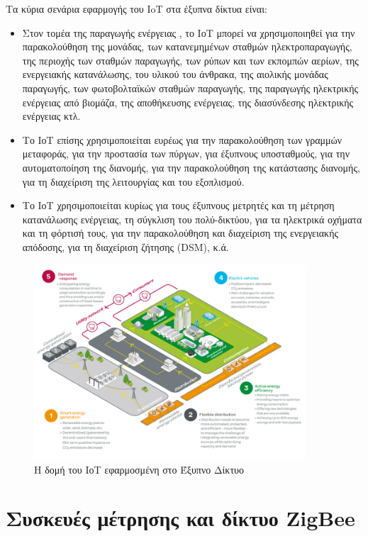 \documentclass[12pt, a4paper, oneside]{report}
\begin{document}
Τα κύρια σενάρια εφαρμογής του IoT στα έξυπνα δίκτυα είναι:
\begin{itemize}
\item Στον τομέα της παραγωγής ενέργειας , το ΙοΤ μπορεί να χρησιμοποιηθεί για την παρακολούθηση της μονάδας, των κατανεμημένων σταθμών ηλεκτροπαραγωγής, της περιοχής των σταθμών παραγωγής, των ρύπων και των εκπομπών αερίων, της ενεργειακής κατανάλωσης, του υλικού του άνθρακα, της αιολικής μονάδας παραγωγής, των φωτοβολταϊκών σταθμών παραγωγής, της παραγωγής ηλεκτρικής ενέργειας από βιομάζα, της αποθήκευσης ενέργειας, της διασύνδεσης ηλεκτρικής ενέργειας κτλ.
\item Το ΙοΤ επίσης χρησιμοποιείται ευρέως για την παρακολούθηση των γραμμών μεταφοράς, για την προστασία των πύργων, για έξυπνους υποσταθμούς, για την αυτοματοποίηση της διανομής, για την παρακολούθηση της κατάστασης διανομής, για τη διαχείριση της λειτουργίας και του εξοπλισμού.
\item Το ΙοΤ χρησιμοποιείται κυρίως για τους έξυπνους μετρητές και τη μέτρηση κατανάλωσης ενέργειας, τη σύγκλιση του πολύ-δικτύου, για τα ηλεκτρικά οχήματα και τη φόρτισή τους, για την παρακολούθηση και διαχείριση της ενεργειακής απόδοσης, για τη διαχείριση ζήτησης (DSM), κ.ά.
\end{itemize}

\begin{figure}[!hb]
\centering
\includegraphics[width=0.9\textwidth]{eikona_10}
\caption[Η δομή του ΙοΤ εφαρμοσμένη στο Έξυπνο Δίκτυο]{Η δομή του ΙοΤ εφαρμοσμένη στο Έξυπνο Δίκτυο\cite{schneider}}
\end{figure}

\chapter{Συσκευές μέτρησης και δίκτυο ZigBee}
\end{document}
